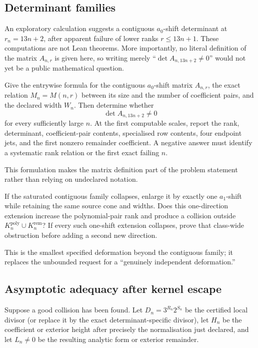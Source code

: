 \documentclass[11pt]{article}
\begin{document}
\subsection{Determinant families}

An exploratory calculation suggests a contiguous $a_0$-shift determinant at
$r_n=13n+2$, after apparent failure of lower ranks $r\le13n+1$.  These
computations are not Lean theorems.  More importantly, no literal definition
of the matrix $A_{n,r}$ is given here, so writing merely
“$\det A_{n,13n+2}\ne0$” would not yet be a public mathematical question.

\begin{problem}
Give the entrywise formula for the contiguous $a_0$-shift matrix $A_{n,r}$,
the exact relation $M_n=M(n,r)$ between its size and the number of coefficient
pairs, and the declared width $W_n$.  Then determine whether
\[
 \det A_{n,13n+2}\ne0
\]
for every sufficiently large $n$.  At the first computable scales, report the
rank, determinant, coefficient-pair contents, specialised row contents, four
endpoint jets, and the first nonzero remainder coefficient.  A negative answer
must identify a systematic rank relation or the first exact failing $n$.
\end{problem}

This formulation makes the matrix definition part of the problem statement
rather than relying on undeclared notation.

\begin{problem}
If the saturated contiguous family collapses, enlarge it by exactly one
$a_1$-shift while retaining the same source cone and widths.  Does this
one-direction extension increase the polynomial-pair rank and produce a
collision outside
$K_n^{\mathrm{poly}}\cup K_n^{\mathrm{rem}}$?  If every such one-shift
extension collapses, prove that class-wide obstruction before adding a second
new direction.
\end{problem}

This is the smallest specified deformation beyond the contiguous family; it
replaces the unbounded request for a “genuinely independent deformation.”

\subsection{Asymptotic adequacy after kernel escape}

Suppose a good collision has been found.  Let $D_n=3^{R_n}2^{S_n}$ be the
certified local divisor (or replace it by the exact determinant-specific
divisor), let $H_n$ be the coefficient or exterior height after precisely the
normalisation just declared, and let $L_n\ne0$ be the resulting analytic form
or exterior remainder.
\end{document}
